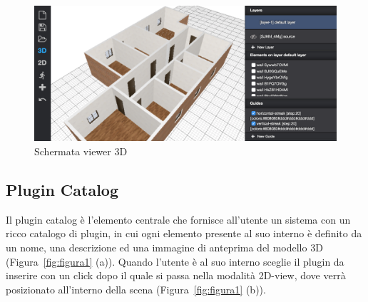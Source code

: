 
\begin{figure}[htbp] %
   \centering
   \includegraphics[width=1\linewidth]{images/3d}
   \caption{Schermata viewer 3D }
   \label{fig:viewer3D}
\end{figure}
\newpage

\subsection{Plugin Catalog}
\label{sec:chapter_2_section_2_sub_3}

\noindent
 Il plugin catalog \`e l'elemento centrale che fornisce all'utente un sistema con un ricco catalogo di plugin,
 in cui ogni elemento presente al suo interno \`e definito da un nome, una descrizione ed una
 immagine di anteprima del modello 3D (Figura~\ref{fig:figura1} (a)). Quando l'utente \`e al suo interno
 sceglie il plugin da inserire con un click dopo il quale si passa nella modalit\`a 2D-view, dove verrà posizionato
 all'interno della scena (Figura~\ref{fig:figura1} (b)).


